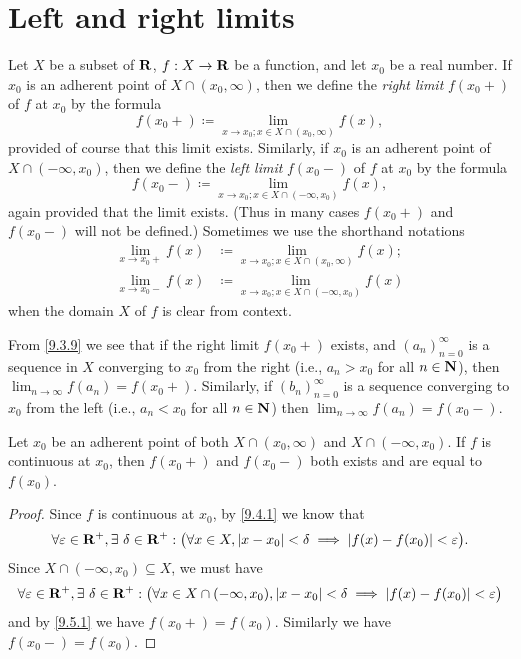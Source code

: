 \section{Left and right limits}\label{sec 9.5}

\begin{definition}\label{9.5.1}
  Let \(X\) be a subset of \(\mathbf{R}\), \(f : X \to \mathbf{R}\) be a function, and let \(x_0\) be a real number.
  If \(x_0\) is an adherent point of \(X \cap (x_0, \infty)\), then we define the \emph{right limit} \(f(x_0+)\) of \(f\) at \(x_0\) by the formula
  \[
    f(x_0+) \coloneqq \lim_{x \to x_0 ; x \in X \cap (x_0, \infty)} f(x),
  \]
  provided of course that this limit exists.
  Similarly, if \(x_0\) is an adherent point of \(X \cap (-\infty, x_0)\), then we define the \emph{left limit} \(f(x_0-)\) of \(f\) at \(x_0\) by the formula
  \[
    f(x_0-) \coloneqq \lim_{x \to x_0 ; x \in X \cap (-\infty, x_0)} f(x),
  \]
  again provided that the limit exists.
  (Thus in many cases \(f(x_0+)\) and \(f(x_0-)\) will not be defined.)
  Sometimes we use the shorthand notations
  \begin{align*}
    \lim_{x \to x_0+} f(x) & \coloneqq \lim_{x \to x_0 ; x \in X \cap (x_0, \infty)} f(x); \\
    \lim_{x \to x_0-} f(x) & \coloneqq \lim_{x \to x_0 ; x \in X \cap (-\infty, x_0)} f(x)
  \end{align*}
  when the domain \(X\) of \(f\) is clear from context.
\end{definition}

\begin{note}
  From \cref{9.3.9} we see that if the right limit \(f(x_0+)\) exists, and \((a_n)_{n = 0}^\infty\) is a sequence in \(X\) converging to \(x_0\) from the right (i.e., \(a_n > x_0\) for all \(n \in \mathbf{N}\)), then \(\lim_{n \to \infty} f(a_n) = f(x_0+)\).
  Similarly, if \((b_n)_{n = 0}^\infty\) is a sequence converging to \(x_0\) from the left (i.e., \(a_n < x_0\) for all \(n \in \mathbf{N}\)) then \(\lim_{n \to \infty} f(a_n) = f(x_0-)\).
\end{note}

\begin{additional corollary}\label{ac 9.5.1}
Let \(x_0\) be an adherent point of both \(X \cap (x_0, \infty)\) and \(X \cap (-\infty, x_0)\).
If \(f\) is continuous at \(x_0\), then \(f(x_0+)\) and \(f(x_0-)\) both exists and are equal to \(f(x_0)\).
\end{additional corollary}

\begin{proof}
  Since \(f\) is continuous at \(x_0\), by \cref{9.4.1} we know that
  \[
    \forall \varepsilon \in \mathbf{R}^+, \exists\ \delta \in \mathbf{R}^+ : \big(\forall x \in X, \left\lvert x - x_0\right\rvert < \delta \implies \left\lvert f(x) - f(x_0)\right\rvert < \varepsilon\big).
  \]
  Since \(X \cap (-\infty, x_0) \subseteq X\), we must have
  \[
    \forall \varepsilon \in \mathbf{R}^+, \exists\ \delta \in \mathbf{R}^+ : \big(\forall x \in X \cap (-\infty, x_0), \left\lvert x - x_0\right\rvert < \delta \implies \left\lvert f(x) - f(x_0)\right\rvert < \varepsilon\big)
  \]
  and by \cref{9.5.1} we have \(f(x_0+) = f(x_0)\).
  Similarly we have \(f(x_0-) = f(x_0)\).
\end{proof}

